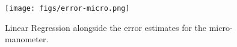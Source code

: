 \documentclass{article}
\begin{document}
\begin{figure}[!htb]
  \begin{center}
    \texttt{[image: figs/error-micro.png]}
    \caption{Linear Regression alongside the error estimates for the micro-manometer. }
    \label{error-micro}
  \end{center}
\end{figure}

\end{document}
